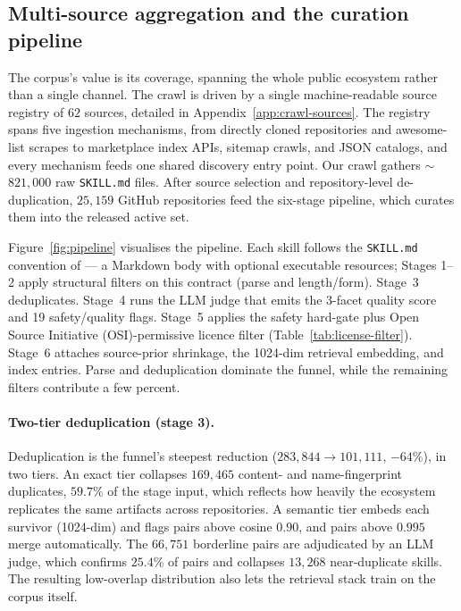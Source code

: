 \subsection{Multi-source aggregation and the curation pipeline}
\label{sec:pipeline}

The corpus's value is its coverage, spanning the whole public
ecosystem rather than a single channel.
The crawl is driven by a single machine-readable source
registry of $62$ sources, detailed in
Appendix~\ref{app:crawl-sources}.  The registry spans five
ingestion mechanisms, from directly cloned repositories and
awesome-list scrapes to marketplace index APIs, sitemap crawls,
and JSON catalogs, and every mechanism feeds one shared discovery
entry point.  Our crawl gathers $\sim$$821{,}000$ raw \texttt{SKILL.md} files.
After source selection and repository-level de-duplication,
$25{,}159$ GitHub repositories feed the six-stage pipeline, which
curates them into the released active set.

Figure~\ref{fig:pipeline} visualises the pipeline.
Each skill follows the \texttt{SKILL.md} convention of \citet{AnthropicSkillCreator2025} — a Markdown body with optional executable resources; Stages 1–2 apply structural filters on this contract (parse and length/form).
Stage~3 deduplicates.  Stage~4 runs the LLM judge that emits the
3-facet quality score and 19 safety/quality flags.  Stage~5
applies the safety hard-gate plus
Open Source Initiative (OSI)-permissive licence filter
(Table~\ref{tab:license-filter}).  Stage~6 attaches source-prior
shrinkage, the 1024-dim retrieval embedding, and index entries.
Parse and deduplication dominate the funnel, while the remaining
filters contribute a few percent.

\paragraph{Two-tier deduplication (stage 3).}
Deduplication is the funnel's steepest reduction
($283{,}844 \to 101{,}111$, $-64\%$), in two tiers.  An exact tier
collapses $169{,}465$ content- and name-fingerprint duplicates,
$59.7\%$ of the stage input, which reflects how
heavily the ecosystem replicates the same artifacts across
repositories.  A semantic tier embeds each survivor (1024-dim)
and flags pairs above cosine $0.90$, and pairs above $0.995$
merge automatically.  The $66{,}751$ borderline pairs are adjudicated
by an LLM judge, which confirms $25.4\%$ of pairs and collapses
$13{,}268$ near-duplicate skills.  The resulting low-overlap
distribution also lets the retrieval stack train on the corpus
itself.

